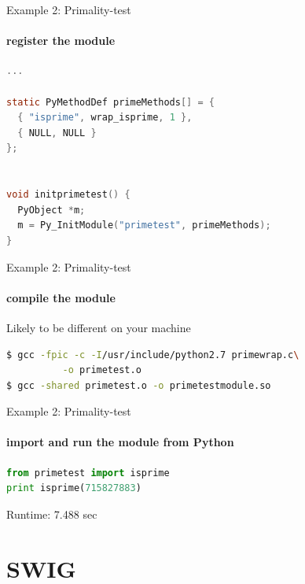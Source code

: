 \documentclass[german]{beamer}
\newcommand{\ra}{\text{$\rightarrow$}}
\begin{document}
\begin{frame}[fragile]{Example 2: Primality-test}
  \framesubtitle{register the module}

  \begin{lstlisting}[language=C,caption=primewrap.c continued]
...

static PyMethodDef primeMethods[] = {
  { "isprime", wrap_isprime, 1 },
  { NULL, NULL }
};


void initprimetest() {
  PyObject *m;
  m = Py_InitModule("primetest", primeMethods);
}
  \end{lstlisting}

  
\end{frame}
\begin{frame}[fragile]{Example 2: Primality-test}
  \framesubtitle{compile the module}

Likely to be different on your machine
  \begin{lstlisting}[language=bash,basicstyle=\footnotesize,caption=compilation]
$ gcc -fpic -c -I/usr/include/python2.7 primewrap.c\
          -o primetest.o
$ gcc -shared primetest.o -o primetestmodule.so
  \end{lstlisting}
\end{frame}
\begin{frame}[fragile]{Example 2: Primality-test}
  \framesubtitle{import and run the module from Python}

  \begin{lstlisting}[language=Python,basicstyle=\footnotesize,caption=test.py]
from primetest import isprime
print isprime(715827883)
  \end{lstlisting}

\ra Runtime: 7.488 sec
\end{frame}

\section{SWIG}
\end{document}
